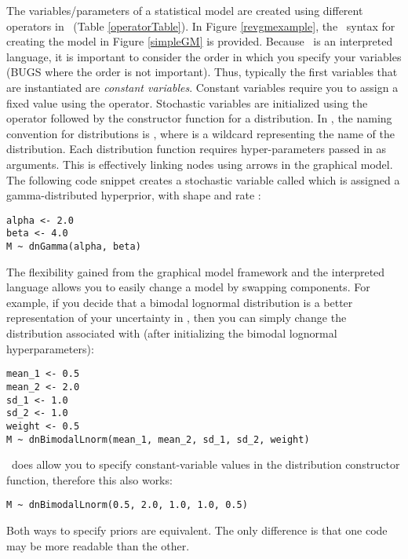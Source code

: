 The variables/parameters of a statistical model are created using different operators in \Rev~(Table \ref{operatorTable}). 
In Figure \ref{revgmexample}, the \Rev~syntax for creating the model in Figure \ref{simpleGM} is provided.
Because \Rev~is an interpreted language, it is important to consider the order in which you specify your variables (\CF BUGS where the order is not important). 
Thus, typically the first variables that are instantiated are \emph{constant variables}. 
Constant variables require you to assign a fixed value using the \cl{<-} operator. 
Stochastic variables are initialized using the \cl{\rbdn} operator followed by the constructor function for a distribution. 
In \Rev, the naming convention for distributions is , where \cl{*} is a wildcard representing the name of the distribution. 
Each distribution function requires hyper-parameters passed in as arguments. 
This is effectively linking nodes using arrows in the graphical model.
The following code snippet creates a stochastic variable called  which is assigned a gamma-distributed hyperprior, with shape  and rate :
{\tt \begin{snugshade*}
\begin{lstlisting}
alpha <- 2.0
beta <- 4.0
M ~ dnGamma(alpha, beta)
\end{lstlisting}
\end{snugshade*}}

The flexibility gained from the graphical model framework and the interpreted language allows you to easily change a model by swapping components. 
For example, if you decide that a bimodal lognormal distribution is a better representation of your uncertainty in , then you can simply change the distribution associated with  (after initializing the bimodal lognormal hyperparameters):
{\tt \begin{snugshade*}
\begin{lstlisting}
mean_1 <- 0.5
mean_2 <- 2.0
sd_1 <- 1.0
sd_2 <- 1.0
weight <- 0.5
M ~ dnBimodalLnorm(mean_1, mean_2, sd_1, sd_2, weight)
\end{lstlisting}
\end{snugshade*}}

\Rev~does allow you to specify constant-variable values in the distribution constructor function, therefore this also works:
{\tt \begin{snugshade*}
\begin{lstlisting}
M ~ dnBimodalLnorm(0.5, 2.0, 1.0, 1.0, 0.5)
\end{lstlisting}
\end{snugshade*}}
Both ways to specify priors are equivalent.
The only difference is that one code may be more readable than the other.




